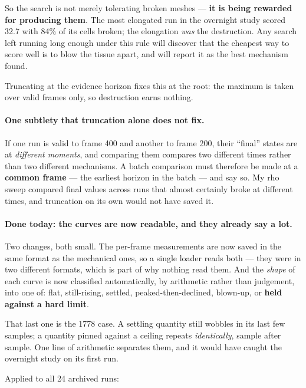\documentclass[11pt,a4paper]{article}
\begin{document}
So the search is not merely tolerating broken meshes --- \textbf{it is being rewarded for producing
them}. The most elongated run in the overnight study scored 32.7 with 84\% of its cells broken; the
elongation \emph{was} the destruction. Any search left running long enough under this rule will
discover that the cheapest way to score well is to blow the tissue apart, and will report it as the
best mechanism found.

Truncating at the evidence horizon fixes this at the root: the maximum is taken over valid frames
only, so destruction earns nothing.

\paragraph{One subtlety that truncation alone does not fix.} If one run is valid to frame 400 and
another to frame 200, their ``final'' states are at \emph{different moments}, and comparing them
compares two different times rather than two different mechanisms. A batch comparison must
therefore be made at a \textbf{common frame} --- the earliest horizon in the batch --- and say so.
My rho sweep compared final values across runs that almost certainly broke at different times, and
truncation on its own would not have saved it.

\paragraph{Done today: the curves are now readable, and they already say a lot.}
Two changes, both small. The per-frame measurements are now saved in the same format as the
mechanical ones, so a single loader reads both --- they were in two different formats, which is
part of why nothing read them. And the \emph{shape} of each curve is now classified
automatically, by arithmetic rather than judgement, into one of: flat, still-rising, settled,
peaked-then-declined, blown-up, or \textbf{held against a hard limit}.

That last one is the 1778 case. A settling quantity still wobbles in its last few samples; a
quantity pinned against a ceiling repeats \emph{identically}, sample after sample. One line of
arithmetic separates them, and it would have caught the overnight study on its first run.

Applied to all 24 archived runs:
\end{document}
